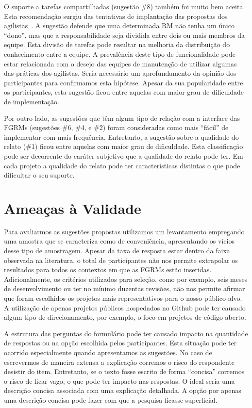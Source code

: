O suporte a tarefas compartilhadas (sugestão \#8) também foi muito bem aceita.
Esta recomendação surgiu das tentativas de implantação das propostas dos
agilistas~\cite{svensson2005introducing}. A sugestão defende que uma
determinada RM não tenha um único ``dono'', mas que a responsabilidade seja
dividida entre dois ou mais membros da equipe. Esta divisão de tarefas pode
resultar na melhoria da distribuição do conhecimento entre a equipe. A
prevalência deste tipo de funcionalidade pode estar relacionada com o desejo
das equipes de manutenção de utilizar algumas das práticas dos agilistas. Seria
necessário um aprofundamento da opinião dos participantes para confirmamos esta
hipótese. Apesar da sua popularidade entre os participantes, esta sugestão
ficou entre aquelas com maior grau de dificuldade de implementação.

Por outro lado, as sugestões que têm algum tipo de relação com a interface das
FGRMs (sugestões \#6, \#4, e \#2) foram consideradas como mais ``fácil'' de
implementar com mais frequência. Entretanto, a sugestão sobre a qualidade do
relato (\#1) ficou entre aquelas com maior grau de dificuldade. Esta
classificação pode ser decorrente do caráter subjetivo que a qualidade do
relato pode ter. Em cada projeto a qualidade do relato pode ter características
distintas o que pode dificultar o seu suporte.

\section{Ameaças à Validade}\label{sec:sug_melhoria_ameacas}

Para avaliarmos as sugestões propostas utilizamos um levantamento empregando
uma amostra que se caracteriza como de conveniência, apresentando os vícios
desse tipo de amostragem. Apesar da taxa de resposta estar dentro da faixa
observada na literatura, o total de participantes não nos permite extrapolar os
resultados para todos os contextos em que as FGRMs estão inseridas.
Adicionalmente, os critérios utilizados para seleção, como por exemplo, seis
meses de desenvolvimento ou ter no mínimo duzentas revisões, não nos permite
afirmar que foram escolhidos os projetos mais representativos para o nosso
público-alvo. A utilização de apenas projetos públicos hospedados no Github
pode ter causado algum tipo de direcionamento, por exemplo, o foco em projetos
de código aberto.

A estrutura das perguntas do formulário pode ter causado impacto na quantidade
de respostas ou na opção escolhida pelos participantes. Esta situação pode ter
ocorrido especialmente quando apresentamos as sugestões. No caso de escrevermos
de maneira extensa a explicação corremos o risco do respondente desistir do
item. Entretanto, se o texto fosse escrito de forma ``concisa'' corremos o
risco de ficar vago, o que pode ter impacto nas respostas. O ideal seria uma
descrição concisa associada com uma explicação detalhada. A opção por apenas
uma descrição concisa pode fazer com que a pesquisa ficasse superficial.

